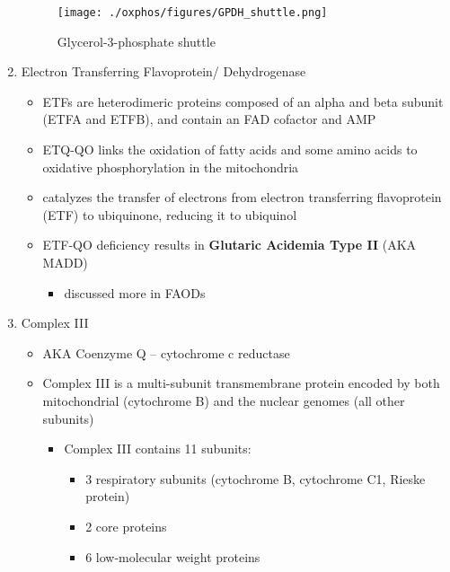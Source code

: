 \documentclass{scrartcl}
\begin{document}
\begin{enumerate}
\begin{figure}[htbp]
\centering
\texttt{[image: ./oxphos/figures/GPDH\_shuttle.png]}
\caption[g3ps]{\label{fig:org06b92d9}
Glycerol-3-phosphate shuttle}
\end{figure}

\item Electron Transferring Flavoprotein/ Dehydrogenase
\label{sec:org539298a}
\begin{itemize}
\item ETFs are heterodimeric proteins composed of an alpha and beta
subunit (ETFA and ETFB), and contain an FAD cofactor and AMP

\item ETQ-QO links the oxidation of fatty acids and some amino acids to
oxidative phosphorylation in the mitochondria
\item catalyzes the transfer of electrons from electron transferring
flavoprotein (ETF) to ubiquinone, reducing it to ubiquinol
\end{itemize}

{\small{}}

\begin{itemize}
\item ETF-QO deficiency results in \textbf{Glutaric Acidemia Type II} (AKA MADD)
\begin{itemize}
\item discussed more in FAODs
\end{itemize}
\end{itemize}
\item Complex III
\label{sec:orge22913f}
\begin{itemize}
\item AKA Coenzyme Q – cytochrome c reductase
\item Complex III is a multi-subunit transmembrane protein encoded by both
mitochondrial (cytochrome B) and the nuclear genomes (all other
subunits)

\begin{itemize}
\item Complex III contains 11 subunits:
\begin{itemize}
\item 3 respiratory subunits (cytochrome B, cytochrome C1, Rieske protein)
\item 2 core proteins
\item 6 low-molecular weight proteins
\end{itemize}
\end{itemize}


\end{itemize}
\end{enumerate}
\end{document}
